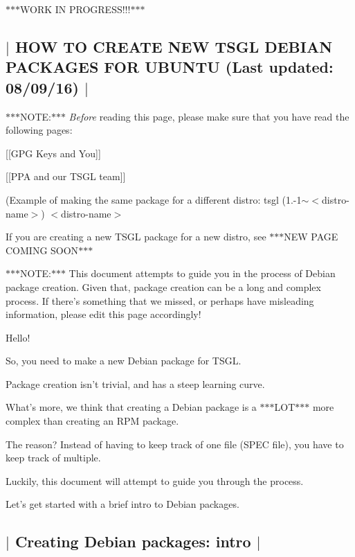 $\ast$$\ast$$\ast$\-W\-O\-R\-K I\-N P\-R\-O\-G\-R\-E\-S\-S!!!$\ast$$\ast$$\ast$ 

 \subsection*{$\vert$ H\-O\-W T\-O C\-R\-E\-A\-T\-E N\-E\-W T\-S\-G\-L D\-E\-B\-I\-A\-N P\-A\-C\-K\-A\-G\-E\-S F\-O\-R U\-B\-U\-N\-T\-U (Last updated\-: 08/09/16) $\vert$ }

$\ast$$\ast$$\ast$\-N\-O\-T\-E\-:$\ast$$\ast$$\ast$ {\itshape Before} reading this page, please make sure that you have read the following pages\-:


\begin{DoxyItemize}
\item \mbox{[}\mbox{[}G\-P\-G Keys and You\mbox{]}\mbox{]}
\item \mbox{[}\mbox{[}P\-P\-A and our T\-S\-G\-L team\mbox{]}\mbox{]}
\end{DoxyItemize}

(Example of making the same package for a different distro\-: tsgl (1.-\/1$\sim$$<$distro-\/name$>$) $<$distro-\/name$>$

If you are creating a new T\-S\-G\-L package for a new distro, see $\ast$$\ast$$\ast$\-N\-E\-W P\-A\-G\-E C\-O\-M\-I\-N\-G S\-O\-O\-N$\ast$$\ast$$\ast$

$\ast$$\ast$$\ast$\-N\-O\-T\-E\-:$\ast$$\ast$$\ast$ This document attempts to guide you in the process of Debian package creation. Given that, package creation can be a long and complex process. If there's something that we missed, or perhaps have misleading information, please edit this page accordingly!

Hello!

So, you need to make a new Debian package for T\-S\-G\-L.

Package creation isn't trivial, and has a steep learning curve.

What's more, we think that creating a Debian package is a $\ast$$\ast$$\ast$\-L\-O\-T$\ast$$\ast$$\ast$ more complex than creating an R\-P\-M package.

The reason? Instead of having to keep track of one file (S\-P\-E\-C file), you have to keep track of multiple.

Luckily, this document will attempt to guide you through the process.

Let's get started with a brief intro to Debian packages. 

 \subsection*{$\vert$ Creating Debian packages\-: intro $\vert$ }

